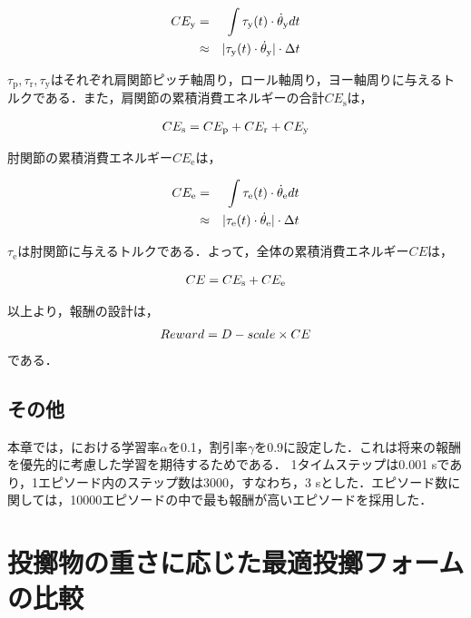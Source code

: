 \begin{eqnarray}
  \equlabel{5.9}
  CE_{\mathrm{y}}&=&\int \tau_{\mathrm{y}}(t)\cdot\dot{\theta}_{\mathrm{y}} dt\\
        &\approx&|\tau_{\mathrm{y}}(t)\cdot\dot{\theta}_{\mathrm{y}}|\cdot\Delta t
\end{eqnarray}

$\tau_{\mathrm{p}},\tau_{\mathrm{r}},\tau_{\mathrm{y}}$はそれぞれ肩関節ピッチ軸周り，ロール軸周り，ヨー軸周りに与えるトルクである．また，肩関節の累積消費エネルギーの合計$CE_{\mathrm{s}}$は，

\begin{eqnarray}
  \equlabel{5.10}
  CE_{\mathrm{s}} = CE_{\mathrm{p}} + CE_{\mathrm{r}} + CE_{\mathrm{y}}
\end{eqnarray}

肘関節の累積消費エネルギー$CE_{\mathrm{e}}$は，

\begin{eqnarray}
  \equlabel{5.11}
  CE_{\mathrm{e}}&=&\int \tau_{\mathrm{e}}(t)\cdot\dot{\theta}_{\mathrm{e}} dt\\
        &\approx&|\tau_{\mathrm{e}}(t)\cdot\dot{\theta}_{\mathrm{e}}|\cdot\Delta t
\end{eqnarray}

$\tau_{\mathrm{e}}$は肘関節に与えるトルクである．よって，全体の累積消費エネルギー$CE$は，

\begin{eqnarray}
  \equlabel{5.12}
  CE = CE_{\mathrm{s}} + CE_{\mathrm{e}}
\end{eqnarray}

以上より，報酬の設計は，
\begin{eqnarray}
  \equlabel{5.13}
  Reward = D - scale \times CE
\end{eqnarray}
である．

\subsection{その他}
本章では，における学習率$\alpha$を0.1，割引率$\gamma$を0.9に設定した．これは将来の報酬を優先的に考慮した学習を期待するためである．
1タイムステップは0.001 sであり，1エピソード内のステップ数は3000，すなわち，3 sとした．エピソード数に関しては，10000エピソードの中で最も報酬が高いエピソードを採用した．

\section{投擲物の重さに応じた最適投擲フォームの比較}
